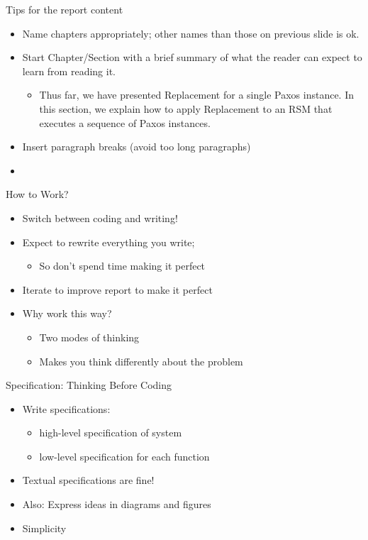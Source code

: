 \documentclass[hyperref={pdfpagelabels=false}, aspectratio=1610]{beamer}
\begin{document}
\begin{frame}
\begin{block}{Tips for the report content}
 \begin{itemize}
  \item Name chapters appropriately; other names than those on previous slide is ok.
  \item Start Chapter/Section with a brief summary of what the reader can expect to learn from reading it.
  \begin{itemize}
   \item Thus far, we have presented Replacement for a single Paxos instance. In this section, we explain how to apply Replacement to an RSM that executes a sequence of Paxos instances.
  \end{itemize}
  \item Insert paragraph breaks (avoid too long paragraphs)
  \item 
 \end{itemize}
\end{block}
\end{frame}


\begin{frame}
\begin{block}{How to Work?}
 \begin{itemize}
  \item<2-> Switch between coding and writing!
  \item<3-> Expect to rewrite everything you write; 
  \begin{itemize}
  	\item<3-> So don't spend time making it perfect 
  \end{itemize}
  \item<4-> Iterate to improve report to make it perfect
  \item<5-> Why work this way?
  \begin{itemize}
	\item<6-> Two modes of thinking
  	\item<6-> Makes you think differently about the problem 
  \end{itemize}
 \end{itemize}
\end{block}
\end{frame}


\begin{frame}
\begin{block}{Specification: Thinking Before Coding}
 \begin{itemize}
  \item Write specifications:
  \begin{itemize}
  	\item high-level specification of system
	\item low-level specification for each function
  \end{itemize}
  \item Textual specifications are fine!
  \item Also: Express ideas in diagrams and figures
  \item Simplicity
 \end{itemize}
\end{block}
\end{frame}
\end{document}
